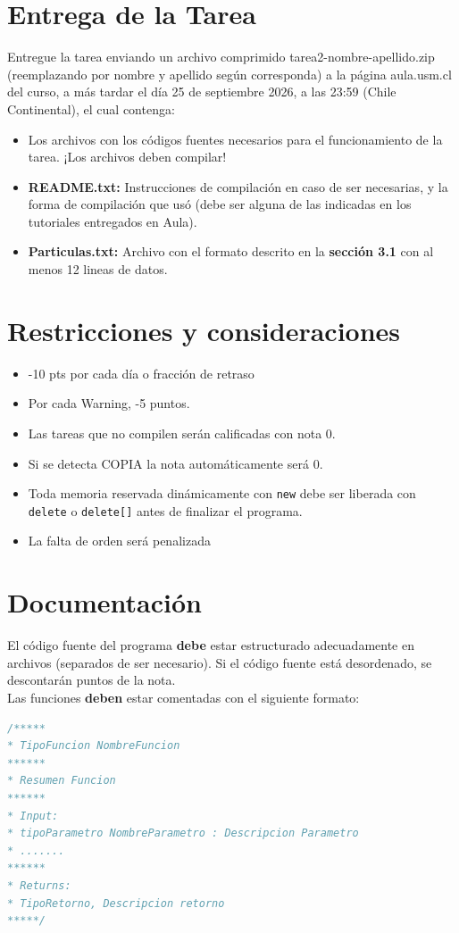 \documentclass[11pt, letterpaper]{article}
\begin{document}
\section{Entrega de la Tarea}
Entregue la tarea enviando un archivo comprimido tarea2-nombre-apellido.zip (reemplazando por 
nombre y apellido según corresponda) a la página aula.usm.cl del curso, a más tardar el día 25 de 
septiembre 2026, a las 23:59 (Chile Continental), el cual contenga: \\
\begin{itemize}[noitemsep, topsep=0pt]
    \item Los archivos con los códigos fuentes necesarios para el funcionamiento de la tarea. ¡Los 
archivos deben compilar!
    
    \item \textbf{README.txt:} Instrucciones de compilación en caso de ser necesarias, y la forma de 
compilación que usó (debe ser alguna de las indicadas en los tutoriales entregados en 
Aula).
    \item \textbf{Particulas.txt:} Archivo con el formato descrito en la \textbf{sección 3.1} con al menos 12 lineas de datos.
\end{itemize}


\section{Restricciones y consideraciones}
\begin{itemize}[noitemsep, topsep=0pt]
    \item -10 pts por cada día o fracción de
retraso\\
    \item Por cada Warning, -5 puntos.  \\
    \item Las tareas que no compilen serán calificadas con nota 0. \\
    \item Si se detecta COPIA la nota automáticamente será 0.\\
    \item Toda memoria reservada dinámicamente con \texttt{new} debe ser liberada con \texttt{delete} o \texttt{delete[]} antes de finalizar el programa.\\
    \item La falta de orden será penalizada
\end{itemize}

\section{Documentación}
El código fuente del programa \textbf{debe} estar estructurado adecuadamente en archivos (separados de
ser necesario). Si el código fuente está desordenado, se descontarán puntos de la nota.\\
Las funciones \textbf{deben} estar comentadas con el siguiente formato:
\begin{lstlisting}[language=C++]
/*****
* TipoFuncion NombreFuncion
******
* Resumen Funcion
******
* Input:
* tipoParametro NombreParametro : Descripcion Parametro
* .......
******
* Returns:
* TipoRetorno, Descripcion retorno
*****/
\end{lstlisting}
\end{document}
